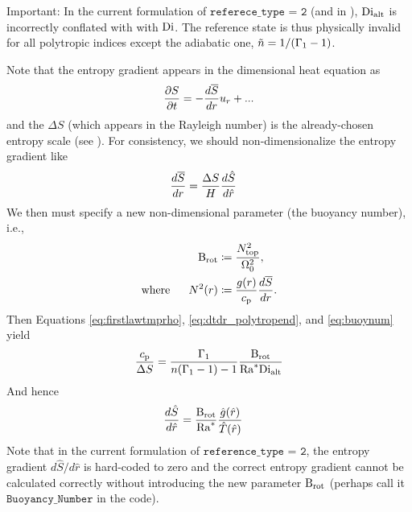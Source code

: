 \documentclass[12pt]{article}
\numberwithin{equation}{section}
\newcommand{\dialt}{\di_{\rm{alt}}}
\begin{document}
Important: In the current formulation of $\texttt{referece\_type = 2}$ (and in \citealt{Heimpel2022}), $\dialt$ is incorrectly conflated with with ${\rm{Di}}$. The reference state is thus physically invalid for all polytropic indices except the adiabatic one, $\tilde{n}=1/(\Gamma_1 - 1)$. 

Note that the entropy gradient appears in the dimensional heat equation as 
\begin{align}
	\frac{\partial S}{\partial t} = -\frac{d\overline{S}}{dr}u_r + ...
\end{align}
and the $\Delta S$ (which appears in the Rayleigh number) is the already-chosen entropy scale (see \citealt{Heimpel2022}). For consistency, we should non-dimensionalize the entropy gradient like
\begin{align}
	\frac{d\overline{S}}{dr}  &=   \frac{\Delta S}{H}   \frac{d\hat{S}}{d\hat{r}}
\end{align}
We then must specify a new non-dimensional parameter (the buoyancy number), i.e., 
\begin{subequations}
\begin{align}
	{\rm{B_{rot}}} &\coloneqq \frac{N_{\rm{top}}^2}{\Omega_0^2},\label{eq:buoynum}\\
	\text{where}\ \ \ \ \  N^2(r) &\coloneqq \frac{g(r)}{c_{\rm{p}}} \frac{d\overline{S}}{dr}.
\end{align}
\end{subequations}
Then Equations \eqref{eq:firstlawtmprho}, \eqref{eq:dtdr_polytropend}, and \eqref{eq:buoynum} yield
\begin{align}
	\frac{\cp}{\Delta S} = \frac{\gammaone}{n(\gammaone - 1) - 1}\frac{\brot}{\ramod \dialt}
\end{align}
And hence
\begin{align}
	\frac{d\hat{S}}{d\hat{r}} &= \frac{{\rm{B_{rot}}}}{{\rm{Ra}}^*}\frac{\hat{g}(\hat{r})}{\hat{T}(\hat{r})}
\end{align}
Note that in the current formulation of $\texttt{reference\_type = 2}$, the entropy gradient $d\hat{S}/d\hat{r}$ is hard-coded to zero and the correct entropy gradient cannot be calculated correctly without introducing the new parameter ${\rm{B_{rot}}}$ (perhaps call it $\texttt{Buoyancy\_Number}$ in the code). 
\end{document}
